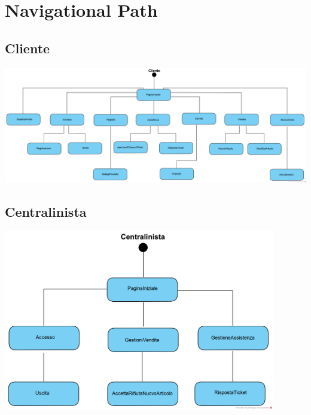 \documentclass[12pt,a4paper]{article}
\begin{document}
\newpage
\section{Navigational Path}
\subsection{Cliente}
\begin{center}
\includegraphics[width=\textwidth]{NavigationalPath/Cliente}
\end{center}

\subsection{Centralinista}
\begin{center}
\includegraphics[height=300px]{NavigationalPath/Centralinista}
\end{center}
\end{document}
